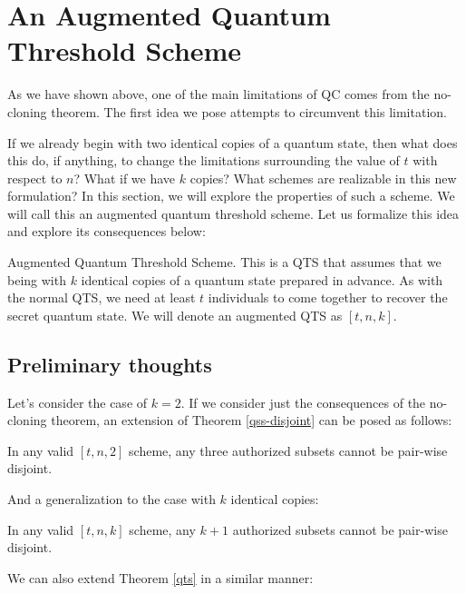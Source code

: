 \chapter{An Augmented Quantum Threshold Scheme}
\label{ch3}

As we have shown above, one of the main limitations of QC comes from the no-cloning theorem. The first idea we pose attempts to circumvent this limitation. 

If we already begin with two identical copies of a quantum state, then what does this do, if anything, to change the limitations surrounding the value of $t$ with respect to $n$? What if we have $k$ copies? What schemes are realizable in this new formulation? In this section, we will explore the properties of such a scheme. We will call this an augmented quantum threshold scheme. Let us formalize this idea and explore its consequences below:

\theoremstyle{definition}
\begin{definition}{Augmented Quantum Threshold Scheme.}
     This is a QTS that assumes that we being with $k$ identical copies of a quantum state prepared in advance. As with the normal QTS, we need at least $t$ individuals to come together to recover the secret quantum state. We will denote an augmented QTS as $[t,n,k]$.
\end{definition}

\section{Preliminary thoughts}

Let's consider the case of $k=2$. If we consider just the consequences of the no-cloning theorem, an extension of Theorem \ref{qss-disjoint} can be posed as follows:

\begin{theorem}
    In any valid $[t,n,2]$ scheme, any three authorized subsets cannot be pair-wise disjoint.
\end{theorem}

And a generalization to the case with $k$ identical copies:

\begin{theorem}
    In any valid $[t,n,k]$ scheme, any $k+1$ authorized subsets cannot be pair-wise disjoint.
\end{theorem}

We can also extend Theorem \ref{qts} in a similar manner:



